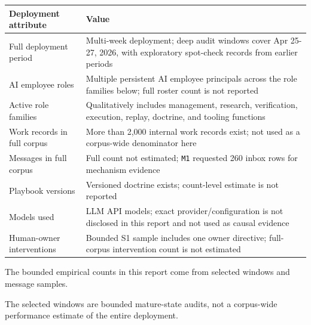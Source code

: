 \documentclass[
]{article}
\newcounter{none} %
\begin{document}
{\def\LTcaptype{none} %
\begin{longtable}[]{@{}
  >{\raggedright\arraybackslash}p{}
  >{\raggedright\arraybackslash}p{}@{}}
\toprule\noalign{}
\begin{minipage}[b]{\linewidth}\raggedright
Deployment attribute
\end{minipage} & \begin{minipage}[b]{\linewidth}\raggedright
Value
\end{minipage} \\
\midrule\noalign{}
\endhead
\bottomrule\noalign{}
\endlastfoot
Full deployment period & Multi-week deployment; deep audit windows cover Apr 25-27, 2026, with exploratory spot-check records from earlier periods \\
AI employee roles & Multiple persistent AI employee principals across the role families below; full roster count is not reported \\
Active role families & Qualitatively includes management, research, verification, execution, replay, doctrine, and tooling functions \\
Work records in full corpus & More than 2,000 internal work records exist; not used as a corpus-wide denominator here \\
Messages in full corpus & Full count not estimated; \texttt{M1} requested 260 inbox rows for mechanism evidence \\
Playbook versions & Versioned doctrine exists; count-level estimate is not reported \\
Models used & LLM API models; exact provider/configuration is not disclosed in this report and not used as causal evidence \\
Human-owner interventions & Bounded S1 sample includes one owner directive; full-corpus intervention count is not estimated \\
\end{longtable}
}

The bounded empirical counts in this report come from selected windows and message samples.

The selected windows are bounded mature-state audits, not a corpus-wide performance estimate of the entire deployment.
\end{document}
